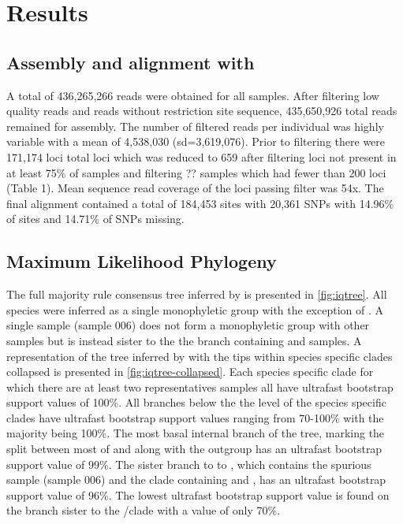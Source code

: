 


\section{Results}

\subsection{Assembly and alignment with \pyrad}
A total of 436,265,266 reads were obtained for all samples. After filtering low
quality reads and reads without restriction site sequence, 435,650,926 total reads 
remained for assembly.
The number of filtered reads per individual was highly variable with a mean of 
4,538,030 (sd=3,619,076).
Prior to filtering there were 171,174 loci total loci which was reduced to  
659 after filtering loci not present in at least 75\% of samples and filtering
?? samples which had fewer than 200 loci (Table 1).
Mean sequence read coverage of the loci passing filter was 54x.
The final alignment contained a total of 184,453 sites with 20,361 SNPs with 
14.96\% of sites and 14.71\% of SNPs missing.

\subsection{Maximum Likelihood Phylogeny}
The full majority rule consensus tree inferred by \iqtree is presented in \ref{fig:iqtree}. 
All species were inferred as a single monophyletic group with the exception 
of \fowl. 
A single \fowl sample (sample 006) does not form a monophyletic group with other 
\fowl samples but is instead sister to the the branch containing \wood and \fowl samples.
A representation of the tree inferred by \iqtree with the tips within
species specific clades collapsed is presented in \ref{fig:iqtree-collapsed}. 
Each species specific clade for which there are at least two representatives
samples all have ultrafast bootstrap support values of 100\%.
All branches below the the level of the species specific clades have ultrafast 
bootstrap support values ranging from 70-100\% with the majority being 100\%.
The most basal internal branch of the tree, marking the split between most of \anaxyrus
and \punctatus along with the outgroup \nebulifer has an ultrafast bootstrap 
support value of 99\%.
The sister branch to to \terr, which contains the spurious \fowl sample (sample 006)
and the clade containing \fowl and \wood, has an ultrafast bootstrap support 
value of 96\%.
The lowest ultrafast bootstrap support value is found on the branch sister 
to the \cognatus/\speciosus clade with a value of only 70\%.

